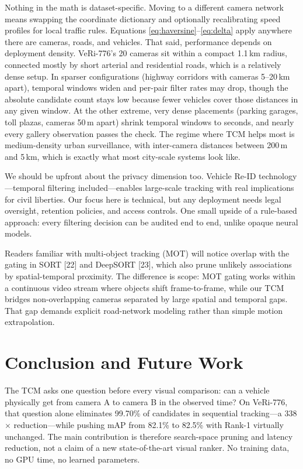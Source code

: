 \documentclass{ijitcs}
\newcommand{\rev}[1]{#1}
\begin{document}
Nothing in the math is dataset-specific. Moving to a different camera network means swapping the coordinate dictionary and optionally recalibrating speed profiles for local traffic rules. Equations \eqref{eq:haversine}--\eqref{eq:delta} apply anywhere there are cameras, roads, and vehicles. That said, performance depends on deployment density. VeRi-776's 20 cameras sit within a compact 1.1\,km radius, connected mostly by short arterial and residential roads, which is a relatively dense setup. In sparser configurations (highway corridors with cameras 5--20\,km apart), temporal windows widen and per-pair filter rates may drop, though the absolute candidate count stays low because fewer vehicles cover those distances in any given window. At the other extreme, very dense placements (parking garages, toll plazas, cameras 50\,m apart) shrink temporal windows to seconds, and nearly every gallery observation passes the check. The regime where TCM helps most is medium-density urban surveillance, with inter-camera distances between 200\,m and 5\,km, which is exactly what most city-scale systems look like.

We should be upfront about the privacy dimension too. Vehicle Re-ID technology---temporal filtering included---enables large-scale tracking with real implications for civil liberties. Our focus here is technical, but any deployment needs legal oversight, retention policies, and access controls. One small upside of a rule-based approach: every filtering decision can be audited end to end, unlike opaque neural models.

Readers familiar with multi-object tracking (MOT) will notice overlap with the gating in SORT [22] and DeepSORT [23], which also prune unlikely associations by spatial-temporal proximity. The difference is scope: MOT gating works within a continuous video stream where objects shift frame-to-frame, while our TCM bridges non-overlapping cameras separated by large spatial and temporal gaps. That gap demands explicit road-network modeling rather than simple motion extrapolation.


\section{Conclusion and Future Work}
The TCM asks one question before every visual comparison: can a vehicle physically get from camera A to camera B in the observed time? On VeRi-776, that question alone eliminates 99.70\% of candidates in sequential tracking---a 338$\times$ reduction---while pushing mAP from 82.1\% to 82.5\% with Rank-1 virtually unchanged. \rev{The main contribution is therefore search-space pruning and latency reduction, not a claim of a new state-of-the-art visual ranker.} No training data, no GPU time, no learned parameters.
\end{document}
